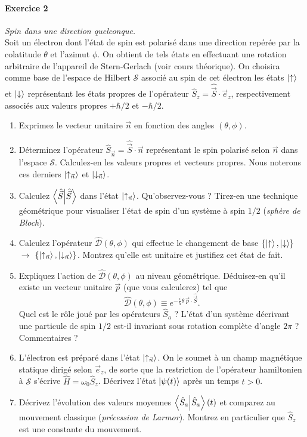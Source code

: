 \paragraph{Exercice 2} \textit{Spin dans une direction quelconque.} \\
Soit un électron dont l'état de spin est polarisé dans une direction repérée par la colatitude $\theta$ et l'azimut $\phi$. On obtient de tels états en effectuant une rotation arbitraire de l'appareil de Stern-Gerlach (voir cours théorique). On choisira comme base de l'espace de Hilbert $\mathcal S$ associé au spin de cet électron les états $\ket{\uparrow}$ et $\ket{\downarrow}$ représentant les états propres de l'opérateur $\hat S_z = \hat{\vec S}\cdot \vec e_z$, respectivement associés aux valeurs propres $+\hbar/2$ et $-\hbar/2$. 
\begin{enumerate}
\item Exprimez le vecteur unitaire $\vec n$ en fonction des angles $(\theta,\phi)$. 
\item Déterminez l'opérateur $\hat S_{\vec n} = \hat{\vec S}\cdot \vec n$ représentant le spin polarisé selon $\vec n$ dans l'espace $\mathcal S$. Calculez-en les valeurs propres et vecteurs propres. Nous noterons ces derniers $\ket{\uparrow_{\vec n}}$ et $\ket{\downarrow_{\vec n}}$.
\item Calculez $\braket{\hat{\vec S}}$ dans l'état $\ket{\uparrow_{\vec n}}$. Qu'observez-vous ? Tirez-en une technique géométrique pour visualiser l'état de spin d'un système à spin $1/2$ (\textit{sphère de Bloch}).
\item Calculez l'opérateur $\hat{\mathcal D} (\theta,\phi)$ qui effectue le changement de base $\lbrace \ket{\uparrow},\ket{\downarrow}\rbrace$ $\to$ $\lbrace \ket{\uparrow_{\vec n}},\ket{\downarrow_{\vec n}}\rbrace$. Montrez qu'elle est unitaire et justifiez cet état de fait.
\item Expliquez l'action de $\hat{\mathcal D}(\theta,\phi)$ au niveau géométrique. Déduisez-en qu'il existe un vecteur unitaire $\vec p$ (que vous calculerez) tel que
\begin{equation}
\hat{\mathcal D}(\theta,\phi) \equiv e^{-\frac{i}{\hbar}\theta \, \vec{p}\cdot \hat{\vec S}}.
\end{equation}
Quel est le rôle joué par les opérateurs $\hat S_a$ ? L'état d'un système décrivant une particule de spin $1/2$ est-il invariant sous rotation complète d'angle $2\pi$ ? Commentaires ?
\item L'électron est préparé dans l'état $\ket{\uparrow_{\vec n}}$. On le soumet à un champ magnétique statique dirigé selon $\vec e_z$, de sorte que la restriction de l'opérateur hamiltonien à $\mathcal S$ s'écrive $\hat H = \omega_0 \hat S_z$. Décrivez l'état $\ket{\psi(t)}$ après un temps $t>0$.
\item Décrivez l'évolution des valeurs moyennes $\braket{\hat S_a}(t)$ et comparez au mouvement classique (\textit{précession de Larmor}). Montrez en particulier que $\hat S_z$ est une constante du mouvement. 
\end{enumerate}

